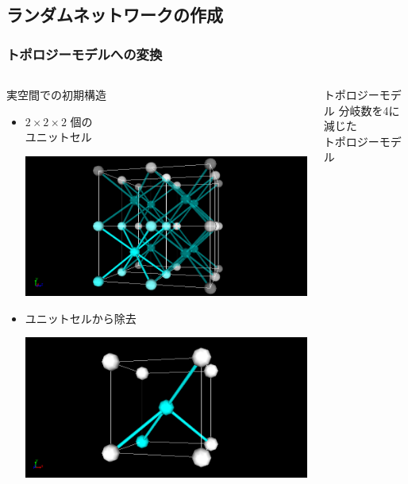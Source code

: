 \documentclass[12pt, dvipdfmx]{beamer}
\begin{document}
\begin{frame}
\begin{columns}[totalwidth=1\textwidth]
    \end{columns}
\end{frame}




\subsection{ランダムネットワークの作成}
\begin{frame}
	\frametitle{トポロジーモデルへの変換}
		\begin{columns}[totalwidth=\textwidth]
				\begin{block}{実空間での初期構造}
					\begin{itemize}
						\item $2\times2\times2$ 個の\\ユニットセル
			
							\includegraphics[width=0.8\columnwidth]{8_per.png}

						\item ユニットセルから除去

							\includegraphics[width=0.8\columnwidth]{8_4.png}

					\end{itemize}
				\end{block}
			\begin{exampleblock}{トポロジーモデル}
				分岐数を4に減じた\\トポロジーモデル


\end{exampleblock}
\end{columns}
\end{frame}
\end{document}
